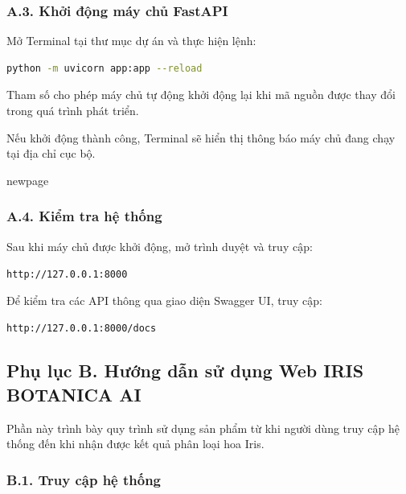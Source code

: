 \documentclass[14pt]{extarticle}
\begin{document}
	\subsubsection*{A.3. Khởi động máy chủ FastAPI}
	
	\noindent
	Mở Terminal tại thư mục dự án và thực hiện lệnh:
	
	\begin{lstlisting}[language=bash,
		numbers=none,
		frame=single,
		basicstyle=\ttfamily\small]
		python -m uvicorn app:app --reload
	\end{lstlisting}
	
	\noindent
	Tham số  cho phép máy chủ tự động khởi động lại khi
	mã nguồn được thay đổi trong quá trình phát triển.
	
	\noindent
	Nếu khởi động thành công, Terminal sẽ hiển thị thông báo máy chủ đang
	chạy tại địa chỉ cục bộ.
	
newpage
	\newpage
	\subsubsection*{A.4. Kiểm tra hệ thống}
	
	\noindent
	Sau khi máy chủ được khởi động, mở trình duyệt và truy cập:
	
	\begin{center}
		\texttt{http://127.0.0.1:8000}
	\end{center}
	
	\noindent
	Để kiểm tra các API thông qua giao diện Swagger UI, truy cập:
	
	\begin{center}
		\texttt{http://127.0.0.1:8000/docs}
	\end{center}
	

	
	
	
	
	\subsection*{Phụ lục B. Hướng dẫn sử dụng Web IRIS BOTANICA AI}
	
	\noindent
	Phần này trình bày quy trình sử dụng sản phẩm từ khi người dùng truy cập
	hệ thống đến khi nhận được kết quả phân loại hoa Iris.
	
	\subsubsection*{B.1. Truy cập hệ thống}
	
\end{document}
